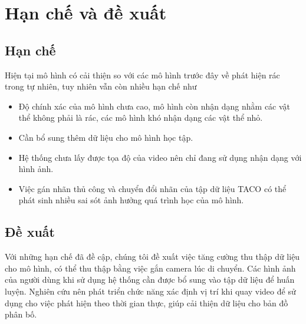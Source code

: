 \documentclass[../the.tex]{subfiles}
\begin{document}
\section{Hạn chế và đề xuất}
\subsection{Hạn chế}
{\fontsize{13}{12} \selectfont
Hiện tại mô hình có cải thiện so với các mô hình trước đây về phát hiện rác trong tự nhiên, tuy nhiên vẫn còn nhiều hạn chế như
\begin{itemize}
    \item Độ chính xác của mô hình chưa cao, mô hình còn nhận dạng nhằm các vật thể không phải là rác, các mô hình khó nhận dạng các vật thể nhỏ.
    \item Cần bổ sung thêm dữ liệu cho mô hình học tập.
    \item Hệ thống chưa lấy được tọa độ của video nên chỉ đang sử dụng nhận dạng với hình ảnh.
    \item Việc gán nhãn thủ công và chuyển đổi nhãn của tập dữ liệu TACO có thể phát sinh nhiều sai sót ảnh hưởng quá trình học của mô hình.	
\end{itemize}

}
\subsection{Đề xuất}
{\fontsize{13}{12} \selectfont 
Với những hạn chế đã đề cập, chúng tôi đề xuất việc tăng cường thu thập dữ liệu cho mô hình, có thể thu thập bằng việc gắn camera lúc di chuyển.
Các hình ảnh của người dùng khi sử dụng hệ thống cần được bổ sung vào tập dữ liệu để huấn luyện.
Nghiên cứu nên phát triển chức năng xác định vị trí khi quay video để sử dụng cho việc phát hiện theo thời gian thực, giúp cải thiện dữ liệu cho bản đồ phân bố.

}
\end{document}
